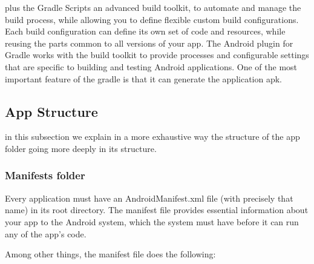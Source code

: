 plus the Gradle Scripts an advanced build toolkit, to automate and manage the build process, while allowing you to define flexible custom build configurations. Each build configuration can define its own set of code and resources, while reusing the parts common to all versions of your app. The Android plugin for Gradle works with the build toolkit to provide processes and configurable settings that are specific to building and testing Android applications. One of the most important feature of the gradle is that it can generate the application apk.

\subsection{App Structure}

in this subsection we explain in a more exhaustive way the structure of the app folder going more deeply in its structure.

\subsubsection{Manifests folder}
Every application must have an AndroidManifest.xml file (with precisely that name) in its root directory. The manifest file provides essential information about your app to the Android system, which the system must have before it can run any of the app's code.

Among other things, the manifest file does the following:

